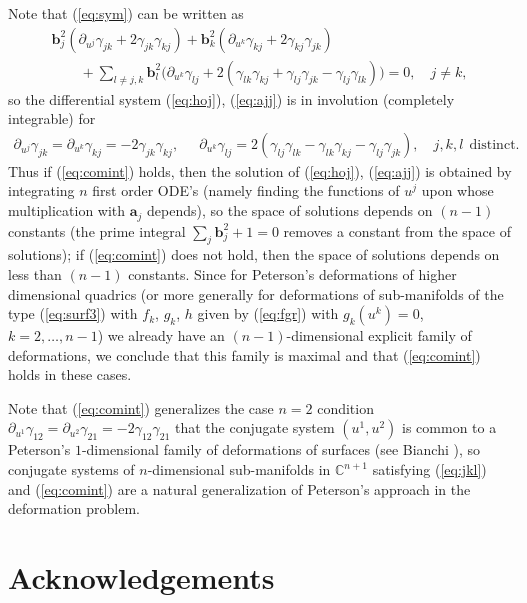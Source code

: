 \documentclass[pdftex]{sigma}
\begin{document}
Note that (\ref{eq:sym}) can be written as
\begin{gather*}
\mathbf{b}_j^2(\partial_{u^j}\gamma_{jk}+2\gamma_{jk}\gamma_{kj})
+\mathbf{b}_k^2(\partial_{u^k}\gamma_{kj}+2\gamma_{kj}\gamma_{jk})
\nonumber\\
\qquad{}+\sum_{l\neq
j,k}\mathbf{b}_l^2\big(\partial_{u^k}\gamma_{lj}+2(\gamma_{lk}\gamma_{kj}
+\gamma_{lj}\gamma_{jk}-\gamma_{lj}\gamma_{lk})\big)=0,\quad j\neq
k,%
\end{gather*}
so the dif\/ferential system (\ref{eq:hoj}), (\ref{eq:ajj}) is in
involution (completely integrable) for
\begin{gather}
\partial_{u^j}\gamma_{jk}=\partial_{u^k}\gamma_{kj}=-2\gamma_{jk}\gamma_{kj},\quad \ \
\partial_{u^k}\gamma_{lj}=2(\gamma_{lj}\gamma_{lk}-\gamma_{lk}\gamma_{kj}
-\gamma_{lj}\gamma_{jk}),\quad  j, k, l \ \
\mathrm{distinct}.\!\!\!\label{eq:comint}
\end{gather}
Thus if (\ref{eq:comint}) holds, then the solution of
(\ref{eq:hoj}), (\ref{eq:ajj}) is obtained by integrating $n$
f\/irst order ODE's (namely f\/inding the functions of $u^j$ upon
whose multiplication with $\mathbf{a}_j$ depends), so the space of
solutions depends on $(n-1)$ constants (the prime integral
$\sum_j\mathbf{b}_j^2+1=0$ removes a constant from the space of
solutions); if (\ref{eq:comint}) does not hold, then the space of
solutions depends on less than $(n-1)$ constants. Since for
Peterson's deformations of higher dimensional quadrics (or more
generally for deformations of sub-manifolds of the type
(\ref{eq:surf3}) with $f_k$, $g_k$, $h$ given by (\ref{eq:fgr}) with
$g_k(u^k)=0$, $k=2,\dots ,n-1$) we already have an $(n-1)$-dimensional
explicit family of deformations, we conclude that this family is
maximal and that (\ref{eq:comint}) holds in these cases.

\begin{remark}
Note that (\ref{eq:comint}) generalizes the case $n=2$ condition
$\partial_{u^1}\gamma_{12}=\partial_{u^2}\gamma_{21}=-2\gamma_{12}\gamma_{21}$
that the conjugate system $(u^1,u^2)$ is common to a Peterson's
$1$-dimensional family of deformations of surfaces (see Bianchi
\cite[Vol.~2, \S\S~294, 295]{B1}), so conjugate systems of
$n$-dimensional sub-manifolds in $\mathbb{C}^{n+1}$ satisfying
(\ref{eq:jkl}) and (\ref{eq:comint}) are a natural generalization
of Peterson's approach in the deformation problem.
\end{remark}

\section*{Acknowledgements}
\end{document}
